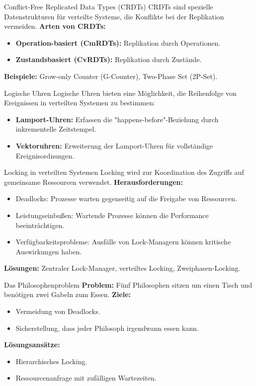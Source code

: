 \documentclass{beamer}
\begin{document}
\begin{frame}{Conflict-Free Replicated Data Types (CRDTs)}
    CRDTs sind spezielle Datenstrukturen für verteilte Systeme, die Konflikte bei der Replikation vermeiden. \newline
    \textbf{Arten von CRDTs:}
    \begin{itemize}
        \item \textbf{Operation-basiert (CmRDTs):} Replikation durch Operationen.
        \item \textbf{Zustandsbasiert (CvRDTs):} Replikation durch Zustände.
    \end{itemize}
    \textbf{Beispiele:} Grow-only Counter (G-Counter), Two-Phase Set (2P-Set).
\end{frame}

\begin{frame}{Logische Uhren}
    Logische Uhren bieten eine Möglichkeit, die Reihenfolge von Ereignissen in verteilten Systemen zu bestimmen:
    \begin{itemize}
        \item \textbf{Lamport-Uhren:} Erfassen die "happens-before"-Beziehung durch inkrementelle Zeitstempel.
        \item \textbf{Vektoruhren:} Erweiterung der Lamport-Uhren für vollständige Ereignisordnungen.
    \end{itemize}
\end{frame}

\begin{frame}{Locking in verteilten Systemen}
    Locking wird zur Koordination des Zugriffs auf gemeinsame Ressourcen verwendet. \newline
    \textbf{Herausforderungen:}
    \begin{itemize}
        \item Deadlocks: Prozesse warten gegenseitig auf die Freigabe von Ressourcen.
        \item Leistungseinbußen: Wartende Prozesse können die Performance beeinträchtigen.
        \item Verfügbarkeitsprobleme: Ausfälle von Lock-Managern können kritische Auswirkungen haben.
    \end{itemize}
    \textbf{Lösungen:} Zentraler Lock-Manager, verteiltes Locking, Zweiphasen-Locking.
\end{frame}

\begin{frame}{Das Philosophenproblem}
    \textbf{Problem:} Fünf Philosophen sitzen um einen Tisch und benötigen zwei Gabeln zum Essen. \newline
    \textbf{Ziele:}
    \begin{itemize}
        \item Vermeidung von Deadlocks.
        \item Sicherstellung, dass jeder Philosoph irgendwann essen kann.
    \end{itemize}
    \textbf{Lösungsansätze:}
    \begin{itemize}
        \item Hierarchisches Locking.
        \item Ressourcenanfrage mit zufälligen Wartezeiten.
    \end{itemize}
\end{frame}
\end{document}
